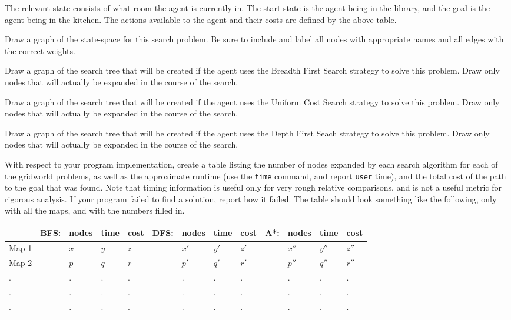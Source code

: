 \documentclass[12pt]{article}
\newcommand{\ttt}[1]{\texttt{#1}}
\newcommand{\n}{\vspace{5mm}}
\newenvironment{questionList}{
\newcounter{ctr}
\begin{list}{\textbf{Question \arabic{ctr}.} \\ \\ }
  {\usecounter{ctr}}
  }{
\end{list}
}
\begin{document}
The relevant state consists of what room the agent is currently in.  The start
state is the agent being in the library, and the goal is the agent being in the
kitchen.  The actions available to the agent and their costs are defined by the
above table.

\begin{questionList}
\item
Draw a graph of the state-space for this search problem.  Be sure to include and
label all nodes with appropriate names and all edges with the correct weights.

\item
Draw a graph of the search tree that will be created if the agent uses the
Breadth First Search strategy to solve this problem.  Draw only nodes that will
actually be expanded in the course of the search.

\item
Draw a graph of the search tree that will be created if the agent uses the
Uniform Cost Search strategy to solve this problem.  Draw only nodes that will
actually be expanded in the course of the search.

\item
Draw a graph of the search tree that will be created if the agent uses the
Depth First Seach strategy to solve this problem.  Draw only nodes that will
actually be expanded in the course of the search.

\item
With respect to your program implementation, create a table listing the
number of nodes expanded by each search algorithm for each of the gridworld
problems, as well as the approximate runtime (use the \ttt{time} command, and
report \ttt{user} time), and the total cost of the path to the goal that was
found.  Note that timing information is useful only for very rough
relative comparisons, and is not a useful metric for rigorous analysis.  If your
program failed to find a solution, report how it failed.
The table should look something like the following, only with all the maps, and
with the numbers filled in.

\n\noindent
{\small
\begin{tabular}{|l|l|l|l|l|l|l|l|l|l|l|l|l|}
  \hline 
  & \textbf{BFS:} & nodes & time & cost & \textbf{DFS:} & nodes & time & cost & \textbf{A*:} & nodes & time & cost\\
  \hline
  Map 1 & & $x$ & $y$ & $z$ & & $x'$ & $y'$ & $z'$ & & $x''$ & $y''$ & $z''$\\
  \hline
  Map 2 & & $p$ & $q$ & $r$ & & $p'$ & $q'$ & $r'$ & & $p''$ & $q''$ & $r''$\\
  \hline
  . &   & . & . & . &   & . & . & . &   & . & . & .\\
  . &   & . & . & . &   & . & . & . &   & . & . & .\\
  . &   & . & . & . &   & . & . & . &   & . & . & .\\
  \hline
\end{tabular}
}


\end{questionList}
\end{document}
